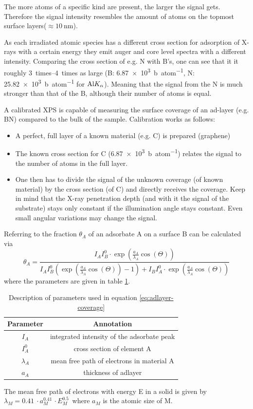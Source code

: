 The more atoms of a specific kind are present, the larger the signal gets. Therefore the signal intensity resembles the amount of atoms on the topmost surface layers($\approx \SI{10}{\nm}$).

As each irradiated atomic species has a different cross section for adsorption of X-rays with a certain energy they emit auger and core level spectra with a different intensity. Comparing the cross section of e.g. N with B's, one can see that it it roughly \SIrange{3}{4}{times} as large (B: \SI{6,87e3}{\barn\per atom}, N: \SI{25,82e3}{\barn\per atom} for $\textnormal{Al} K_{\alpha}$)\cite{henke_x-ray_1993}. Meaning that the signal from the N is much stronger than that of the B, although their number of atoms is equal.

A calibrated XPS is capable of measuring the surface coverage of an ad-layer (e.g. BN) compared to the bulk of the sample. Calibration works as follows:
\begin{itemize}
 \item A perfect, full layer of a known material (e.g. C) is prepared (graphene)
 \item The known cross section for C (\SI{6,87e3}{\barn\per atom})\cite{henke_x-ray_1993} relates the signal to the number of atoms in the full layer.
 \item One then has to divide the signal of the unknown coverage (of known material) by the cross section (of C) and directly receives the coverage. Keep in mind that the X-ray penetration depth (and with it the signal of the substrate) stays only constant if the illumination angle stays constant. Even small angular variations may change the signal.
\end{itemize}
Referring to \cite{ertl_low_1986} the fraction $\theta_A$ of an adsorbate A on a surface B can be calculated via
\begin{equation}\label{eq:adlayer-coverage}
 \theta_A=\frac{I_AI_B^0\cdot \exp(\frac{a_A}{\lambda_A}\cos(\Theta))}{I_AI_B^0( \exp(\frac{a_A}{\lambda_A}\cos(\Theta))-1)+I_BI_A^0\cdot \exp(\frac{a_A}{\lambda_A}\cos(\Theta))}
\end{equation}
where the parameters are given in table \ref{tab:adlayer-coverage-parameters}.

\begin{table}[h!]\centering
\caption{Description of parameters used in equation
\ref{eq:adlayer-coverage}}
\label{tab:adlayer-coverage-parameters}
 \begin{tabular}{cc}
  Parameter & Annotation \\ \hline
  $I_A$	& integrated intensity of the adsorbate peak \\
  $I_A^0$ & cross section of element A \\
  $\lambda_A$ & mean free path of electrons in material A \\
  $a_A$ & thickness of adlayer \\
 \end{tabular}
\end{table}

The mean free path of electrons with energy E in a solid is given by $\lambda_M=\SI{0,41}{}\cdot a_M^{\SI{0,41}{}}\cdot E_M^{\SI{0,5}{}} $ where $a_M$ is the atomic size of M. 